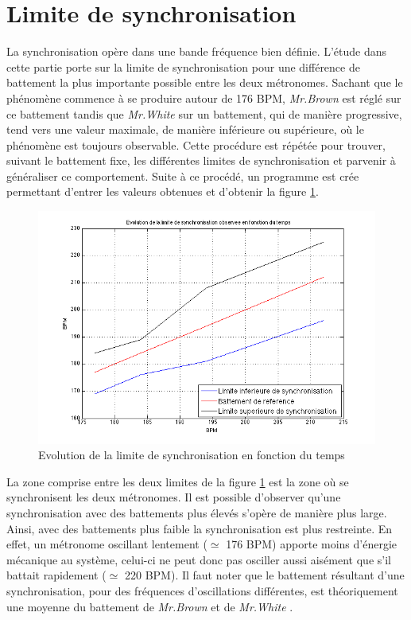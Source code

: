 \documentclass[a4paper,11pt]{report}
\begin{document}
\section{Limite de synchronisation}
La synchronisation opère dans une bande fréquence bien définie. L'étude dans cette partie porte sur la limite de synchronisation pour une différence de battement la plus importante possible entre les deux métronomes. Sachant que le phénomène commence à se produire autour de 176 BPM, {\it Mr.Brown} est réglé sur ce battement tandis que {\it Mr.White} sur un battement, qui de manière progressive, tend vers une valeur maximale, de manière inférieure ou supérieure, où le phénomène est toujours observable. Cette procédure est répétée pour trouver, suivant le battement fixe, les différentes limites de synchronisation et parvenir à généraliser ce comportement. Suite à ce procédé, un programme est crée permettant d'entrer les valeurs obtenues et d'obtenir la figure \ref{LimiteF}.
\begin{figure}[h]
\centering
\includegraphics[width=1\textwidth]{CourbeLimiteSynchro}
\caption{Evolution de la limite de synchronisation en fonction du temps}\label{LimiteF}
\end{figure}

La zone comprise entre les deux limites de la figure \ref{LimiteF} est la zone où se synchronisent les deux métronomes. Il est possible d'observer qu'une synchronisation avec des battements plus élevés s'opère de manière plus large. Ainsi, avec des battements plus faible la synchronisation est plus restreinte. En effet, un métronome oscillant lentement ($\simeq$ 176 BPM) apporte moins d'énergie mécanique au système, celui-ci ne peut donc pas osciller aussi aisément que s'il battait rapidement ($\simeq$ 220 BPM). Il faut noter que le battement résultant d'une synchronisation, pour des fréquences d'oscillations différentes, est théoriquement une moyenne du battement de {\it Mr.Brown} et de {\it Mr.White} \cite{piko}.
\end{document}
